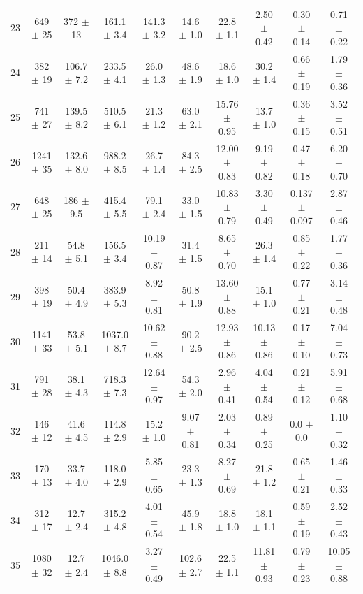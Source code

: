 \begin{table}[]
\begin{adjustwidth}{-2.0cm}{-1.5cm}
\begin{tabular}{c|cc|ccccccc}
23 & 649 $\pm$ 25 & 372 $\pm$ 13 & 161.1 $\pm$ 3.4 & 141.3 $\pm$ 3.2 & 14.6 $\pm$ 1.0 & 22.8 $\pm$ 1.1 & 2.50 $\pm$ 0.42 & 0.30 $\pm$ 0.14 & 0.71 $\pm$ 0.22 \\ 
24 & 382 $\pm$ 19 & 106.7 $\pm$ 7.2 & 233.5 $\pm$ 4.1 & 26.0 $\pm$ 1.3 & 48.6 $\pm$ 1.9 & 18.6 $\pm$ 1.0 & 30.2 $\pm$ 1.4 & 0.66 $\pm$ 0.19 & 1.79 $\pm$ 0.36 \\ 
25 & 741 $\pm$ 27 & 139.5 $\pm$ 8.2 & 510.5 $\pm$ 6.1 & 21.3 $\pm$ 1.2 & 63.0 $\pm$ 2.1 & 15.76 $\pm$ 0.95 & 13.7 $\pm$ 1.0 & 0.36 $\pm$ 0.15 & 3.52 $\pm$ 0.51 \\ 
26 & 1241 $\pm$ 35 & 132.6 $\pm$ 8.0 & 988.2 $\pm$ 8.5 & 26.7 $\pm$ 1.4 & 84.3 $\pm$ 2.5 & 12.00 $\pm$ 0.83 & 9.19 $\pm$ 0.82 & 0.47 $\pm$ 0.18 & 6.20 $\pm$ 0.70 \\ 
27 & 648 $\pm$ 25 & 186 $\pm$ 9.5 & 415.4 $\pm$ 5.5 & 79.1 $\pm$ 2.4 & 33.0 $\pm$ 1.5 & 10.83 $\pm$ 0.79 & 3.30 $\pm$ 0.49 & 0.137 $\pm$ 0.097 & 2.87 $\pm$ 0.46 \\ 
28 & 211 $\pm$ 14 & 54.8 $\pm$ 5.1 & 156.5 $\pm$ 3.4 & 10.19 $\pm$ 0.87 & 31.4 $\pm$ 1.5 & 8.65 $\pm$ 0.70 & 26.3 $\pm$ 1.4 & 0.85 $\pm$ 0.22 & 1.77 $\pm$ 0.36 \\ 
29 & 398 $\pm$ 19 & 50.4 $\pm$ 4.9 & 383.9 $\pm$ 5.3 & 8.92 $\pm$ 0.81 & 50.8 $\pm$ 1.9 & 13.60 $\pm$ 0.88 & 15.1 $\pm$ 1.0 & 0.77 $\pm$ 0.21 & 3.14 $\pm$ 0.48 \\ 
30 & 1141 $\pm$ 33 & 53.8 $\pm$ 5.1 & 1037.0 $\pm$ 8.7 & 10.62 $\pm$ 0.88 & 90.2 $\pm$ 2.5 & 12.93 $\pm$ 0.86 & 10.13 $\pm$ 0.86 & 0.17 $\pm$ 0.10 & 7.04 $\pm$ 0.73 \\ 
31 & 791 $\pm$ 28 & 38.1 $\pm$ 4.3 & 718.3 $\pm$ 7.3 & 12.64 $\pm$ 0.97 & 54.3 $\pm$ 2.0 & 2.96 $\pm$ 0.41 & 4.04 $\pm$ 0.54 & 0.21 $\pm$ 0.12 & 5.91 $\pm$ 0.68 \\ 
32 & 146 $\pm$ 12 & 41.6 $\pm$ 4.5 & 114.8 $\pm$ 2.9 & 15.2 $\pm$ 1.0 & 9.07 $\pm$ 0.81 & 2.03 $\pm$ 0.34 & 0.89 $\pm$ 0.25 & 0.0 $\pm$ 0.0 & 1.10 $\pm$ 0.32 \\ 
33 & 170 $\pm$ 13 & 33.7 $\pm$ 4.0 & 118.0 $\pm$ 2.9 & 5.85 $\pm$ 0.65 & 23.3 $\pm$ 1.3 & 8.27 $\pm$ 0.69 & 21.8 $\pm$ 1.2 & 0.65 $\pm$ 0.21 & 1.46 $\pm$ 0.33 \\ 
34 & 312 $\pm$ 17 & 12.7 $\pm$ 2.4 & 315.2 $\pm$ 4.8 & 4.01 $\pm$ 0.54 & 45.9 $\pm$ 1.8 & 18.8 $\pm$ 1.0 & 18.1 $\pm$ 1.1 & 0.59 $\pm$ 0.19 & 2.52 $\pm$ 0.43 \\ 
35 & 1080 $\pm$ 32 & 12.7 $\pm$ 2.4 & 1046.0 $\pm$ 8.8 & 3.27 $\pm$ 0.49 & 102.6 $\pm$ 2.7 & 22.5 $\pm$ 1.1 & 11.81 $\pm$ 0.93 & 0.79 $\pm$ 0.23 & 10.05 $\pm$ 0.88 \\ 

\end{tabular}
\end{adjustwidth}
\end{table}
